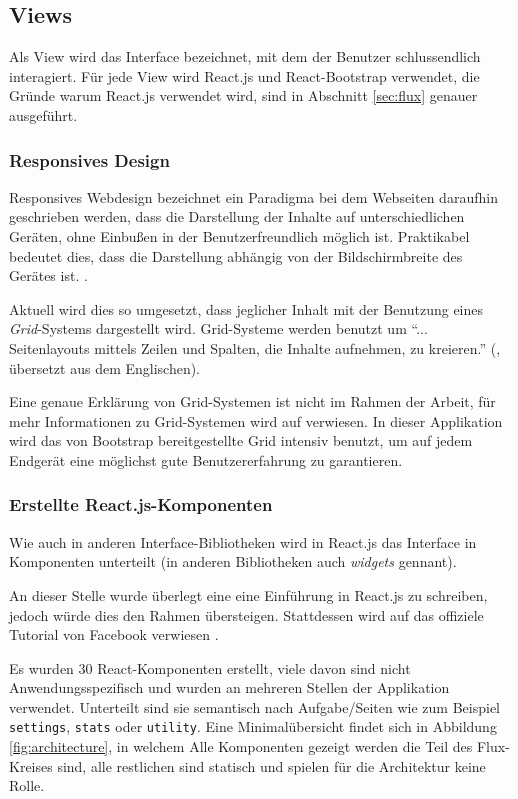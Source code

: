 \documentclass[12pt,twoside]{book}
\begin{document}
\subsection{Views}

Als View wird das Interface bezeichnet, mit dem der Benutzer schlussendlich interagiert. Für jede View wird React.js und React-Bootstrap verwendet, die Gründe warum React.js verwendet wird, sind in Abschnitt \ref{sec:flux} genauer ausgeführt.

\subsubsection*{Responsives Design}

Responsives Webdesign bezeichnet ein Paradigma bei dem Webseiten daraufhin geschrieben werden, dass die Darstellung der Inhalte auf unterschiedlichen Geräten, ohne Einbußen in der Benutzerfreundlich möglich ist. Praktikabel bedeutet dies, dass die Darstellung abhängig von der Bildschirmbreite des Gerätes ist. \cite{natda2013responsive}.

Aktuell wird dies so umgesetzt, dass jeglicher Inhalt mit der Benutzung eines \textit{Grid}-Systems dargestellt wird. Grid-Systeme werden benutzt um ``... Seitenlayouts mittels Zeilen und Spalten, die Inhalte aufnehmen, zu kreieren.'' (\cite{bootstrap}, übersetzt aus dem Englischen). 

Eine genaue Erklärung von Grid-Systemen ist nicht im Rahmen der Arbeit, für mehr Informationen zu Grid-Systemen wird auf \cite{bootstrap} verwiesen.
In dieser Applikation wird das von Bootstrap bereitgestellte Grid intensiv benutzt, um auf jedem Endgerät eine möglichst gute Benutzererfahrung zu garantieren.

\subsubsection*{Erstellte React.js-Komponenten}

Wie auch in anderen Interface-Bibliotheken wird in React.js das Interface in Komponenten unterteilt (in anderen Bibliotheken auch \textit{widgets} gennant).

An dieser Stelle wurde überlegt eine eine Einführung in React.js zu schreiben, jedoch würde dies den Rahmen übersteigen. Stattdessen wird auf das offiziele Tutorial von Facebook verwiesen \cite{tutorial}.

Es wurden 30 React-Komponenten erstellt, viele davon sind nicht Anwendungsspezifisch und wurden an mehreren Stellen der Applikation verwendet. Unterteilt sind sie semantisch nach Aufgabe/Seiten wie zum Beispiel \texttt{settings}, \texttt{stats} oder \texttt{utility}.
Eine Minimalübersicht findet sich in Abbildung \ref{fig:architecture}, in welchem Alle Komponenten gezeigt werden die Teil des Flux-Kreises sind, alle restlichen sind statisch und spielen für die Architektur keine Rolle.
\end{document}
